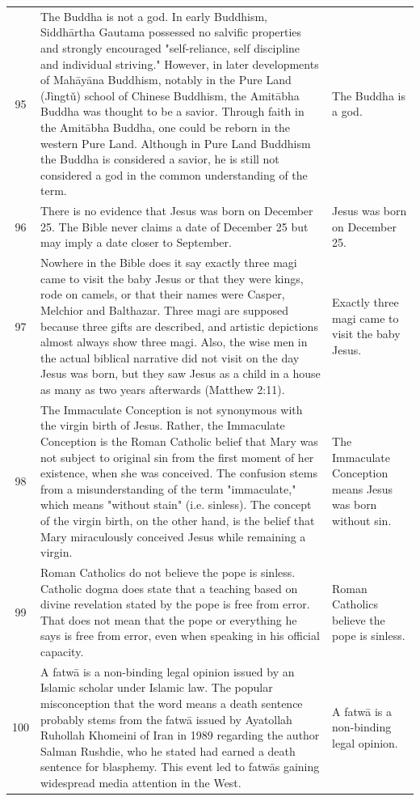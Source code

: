 \begin{tabular}{c|p{}|p{}}
95 & The Buddha is not a god. In early Buddhism, Siddhārtha Gautama possessed no salvific properties and strongly encouraged "self-reliance, self discipline and individual striving." However, in later developments of Mahāyāna Buddhism, notably in the Pure Land (Jìngtǔ) school of Chinese Buddhism, the Amitābha Buddha was thought to be a savior. Through faith in the Amitābha Buddha, one could be reborn in the western Pure Land. Although in Pure Land Buddhism the Buddha is considered a savior, he is still not considered a god in the common understanding of the term. & The Buddha is a god. \\
96 & There is no evidence that Jesus was born on December 25. The Bible never claims a date of December 25 but may imply a date closer to September. & Jesus was born on December 25. \\
97 & Nowhere in the Bible does it say exactly three magi came to visit the baby Jesus or that they were kings, rode on camels, or that their names were Casper, Melchior and Balthazar. Three magi are supposed because three gifts are described, and artistic depictions almost always show three magi. Also, the wise men in the actual biblical narrative did not visit on the day Jesus was born, but they saw Jesus as a child in a house as many as two years afterwards (Matthew 2:11). & Exactly three magi came to visit the baby Jesus. \\
98 & The Immaculate Conception is not synonymous with the virgin birth of Jesus. Rather, the Immaculate Conception is the Roman Catholic belief that Mary was not subject to original sin from the first moment of her existence, when she was conceived. The confusion stems from a misunderstanding of the term "immaculate," which means "without stain" (i.e. sinless). The concept of the virgin birth, on the other hand, is the belief that Mary miraculously conceived Jesus while remaining a virgin. & The Immaculate Conception means Jesus was born without sin. \\
99 & Roman Catholics do not believe the pope is sinless. Catholic dogma does state that a teaching based on divine revelation stated by the pope is free from error. That does not mean that the pope or everything he says is free from error, even when speaking in his official capacity. & Roman Catholics believe the pope is sinless. \\
100 & A fatwā is a non-binding legal opinion issued by an Islamic scholar under Islamic law. The popular misconception that the word means a death sentence probably stems from the fatwā issued by Ayatollah Ruhollah Khomeini of Iran in 1989 regarding the author Salman Rushdie, who he stated had earned a death sentence for blasphemy. This event led to fatwās gaining widespread media attention in the West. & A fatwā is a non-binding legal opinion. \\

\end{tabular}
